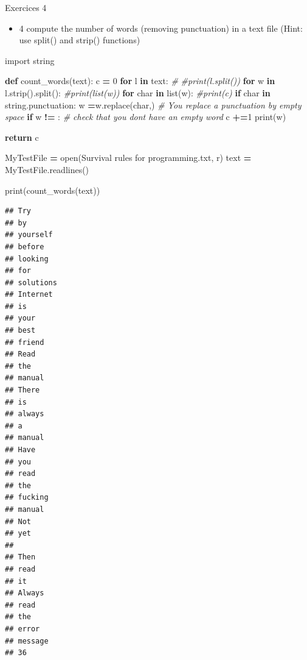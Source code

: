 \documentclass[
  8pt,
  ignorenonframetext,
]{beamer}
\newenvironment{Shaded}{\begin{snugshade}}{\end{snugshade}}
\newcommand{\BuiltInTok}[1]{#1}
\newcommand{\CommentTok}[1]{\textcolor[rgb]{0.56,0.35,0.01}{\textit{#1}}}
\newcommand{\ControlFlowTok}[1]{\textcolor[rgb]{0.13,0.29,0.53}{\textbf{#1}}}
\newcommand{\DecValTok}[1]{\textcolor[rgb]{0.00,0.00,0.81}{#1}}
\newcommand{\ImportTok}[1]{#1}
\newcommand{\KeywordTok}[1]{\textcolor[rgb]{0.13,0.29,0.53}{\textbf{#1}}}
\newcommand{\NormalTok}[1]{#1}
\newcommand{\OperatorTok}[1]{\textcolor[rgb]{0.81,0.36,0.00}{\textbf{#1}}}
\newcommand{\StringTok}[1]{\textcolor[rgb]{0.31,0.60,0.02}{#1}}
\providecommand{\tightlist}{%
  \setlength{\itemsep}{0pt}\setlength{\parskip}{0pt}}
\begin{document}
\begin{frame}[fragile]{Exercices 4}
\protect\hypertarget{exercices-4}{}
\begin{itemize}
\tightlist
\item
  4 compute the number of words (removing punctuation) in a text file
  (Hint: use split() and strip() functions)
\end{itemize}

\begin{Shaded}
\begin{Highlighting}[]
\ImportTok{import}\NormalTok{ string}

\KeywordTok{def}\NormalTok{ count\_words(text):}
\NormalTok{  c }\OperatorTok{=} \DecValTok{0}
  \ControlFlowTok{for}\NormalTok{ l }\KeywordTok{in}\NormalTok{ text: }\CommentTok{\# }
    \CommentTok{\#print(l.split())}
    \ControlFlowTok{for}\NormalTok{ w }\KeywordTok{in}\NormalTok{ l.strip().split():}
      \CommentTok{\#print(list(w))}
      \ControlFlowTok{for}\NormalTok{ char }\KeywordTok{in} \BuiltInTok{list}\NormalTok{(w):}
        \CommentTok{\#print(c)}
          \ControlFlowTok{if}\NormalTok{ char }\KeywordTok{in}\NormalTok{ string.punctuation:}
\NormalTok{            w }\OperatorTok{=}\NormalTok{w.replace(char,}\StringTok{\textquotesingle{}\textquotesingle{}}\NormalTok{) }\CommentTok{\# You replace a punctuation by empty space}
      \ControlFlowTok{if}\NormalTok{ w }\OperatorTok{!=} \StringTok{\textquotesingle{}\textquotesingle{}}\NormalTok{: }\CommentTok{\# check that you don\textquotesingle{}t have an empty word}
\NormalTok{        c }\OperatorTok{+=}\DecValTok{1}
      \BuiltInTok{print}\NormalTok{(w)}
          
  \ControlFlowTok{return}\NormalTok{ c}

\NormalTok{MyTestFile }\OperatorTok{=} \BuiltInTok{open}\NormalTok{(}\StringTok{\textquotesingle{}Survival rules for programming.txt\textquotesingle{}}\NormalTok{, }\StringTok{\textquotesingle{}r\textquotesingle{}}\NormalTok{)}
\NormalTok{text }\OperatorTok{=}\NormalTok{ MyTestFile.readlines()}

\BuiltInTok{print}\NormalTok{(count\_words(text))}
\end{Highlighting}
\end{Shaded}

\begin{verbatim}
## Try
## by
## yourself
## before
## looking
## for
## solutions
## Internet
## is
## your
## best
## friend
## Read
## the
## manual
## There
## is
## always
## a
## manual
## Have
## you
## read
## the
## fucking
## manual
## Not
## yet
## 
## Then
## read
## it
## Always
## read
## the
## error
## message
## 36
\end{verbatim}
\end{frame}
\end{document}

